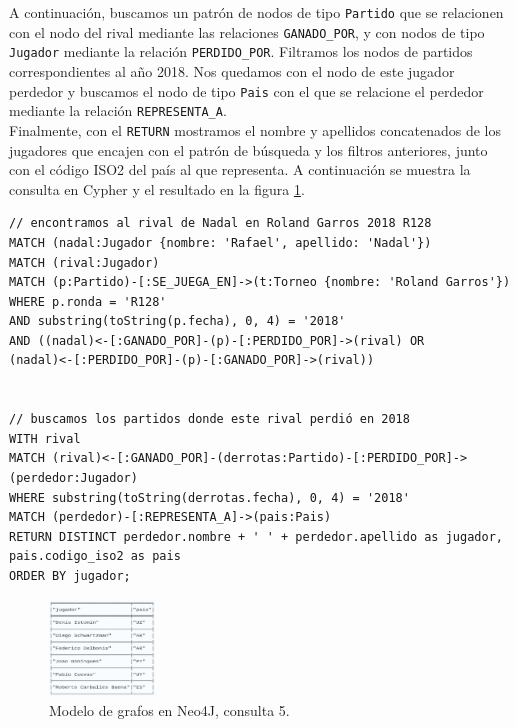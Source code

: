 A continuación, buscamos un patrón de nodos de tipo \texttt{Partido} que se relacionen con el nodo del rival mediante las relaciones \texttt{GANADO\_POR}, y con nodos de tipo \texttt{Jugador} mediante la relación \texttt{PERDIDO\_POR}. Filtramos los nodos de partidos correspondientes al año 2018. Nos quedamos con el nodo de este jugador perdedor y buscamos el nodo de tipo \texttt{Pais} con el que se relacione el perdedor mediante la relación \texttt{REPRESENTA\_A}. \\

Finalmente, con el \texttt{RETURN} mostramos el nombre y apellidos concatenados de los jugadores que encajen con el patrón de búsqueda y los filtros anteriores, junto con el código ISO2 del país al que representa. A continuación se muestra la consulta en Cypher y el resultado en la figura \ref{fig:q5_neo}.

\begin{verbatim}
// encontramos al rival de Nadal en Roland Garros 2018 R128
MATCH (nadal:Jugador {nombre: 'Rafael', apellido: 'Nadal'})
MATCH (rival:Jugador)
MATCH (p:Partido)-[:SE_JUEGA_EN]->(t:Torneo {nombre: 'Roland Garros'})
WHERE p.ronda = 'R128'
AND substring(toString(p.fecha), 0, 4) = '2018'
AND ((nadal)<-[:GANADO_POR]-(p)-[:PERDIDO_POR]->(rival) OR
(nadal)<-[:PERDIDO_POR]-(p)-[:GANADO_POR]->(rival))


// buscamos los partidos donde este rival perdió en 2018
WITH rival
MATCH (rival)<-[:GANADO_POR]-(derrotas:Partido)-[:PERDIDO_POR]->(perdedor:Jugador)
WHERE substring(toString(derrotas.fecha), 0, 4) = '2018'
MATCH (perdedor)-[:REPRESENTA_A]->(pais:Pais)
RETURN DISTINCT perdedor.nombre + ' ' + perdedor.apellido as jugador, pais.codigo_iso2 as pais
ORDER BY jugador;
\end{verbatim}

\begin{figure}[H]
\centering
\includegraphics[width=0.25\textwidth]{fotos/q5_neo.png}
\caption{Modelo de grafos en Neo4J, consulta 5.}
\label{fig:q5_neo}
\end{figure}